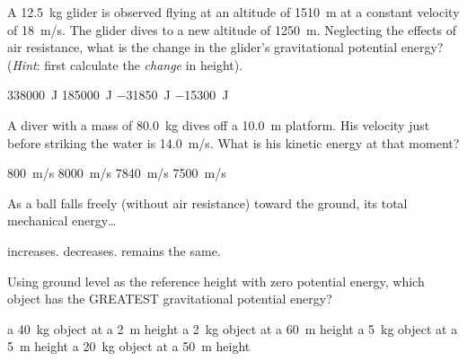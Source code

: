 \documentclass{exam}
\begin{document}
\begin{questions}
\begin{center}
\begin{minipage}{0.4\textwidth}
\begin{center}
\end{center}
\end{minipage}
\end{center}

\question
A \SI{12.5}{kg} glider is observed flying at an altitude of \SI{1510}{m} at a constant velocity of \SI{18}{m/s}. The glider dives to a new altitude of \SI{1250}{m}. Neglecting the effects of air resistance, what is the change in the glider's gravitational potential energy? (\textit{Hint}: first calculate the \textit{change} in height).

\begin{randomizeoneparchoices}
\choice \SI{338000}{J}
\choice \SI{185000}{J}
\correctchoice \SI{-31850}{J}
\choice \SI{-15300}{J}
\end{randomizeoneparchoices}

\question
A diver with a mass of \SI{80.0}{kg} dives off a \SI{10.0}{m} platform. His velocity just before striking the water is \SI{14.0}{m/s}. What is his kinetic energy at that moment?

\begin{randomizeoneparchoices}
\choice \SI{800}{m/s}
\choice \SI{8000}{m/s}
\correctchoice \SI{7840}{m/s}
\choice \SI{7500}{m/s}
\end{randomizeoneparchoices}

\question
As a ball falls freely (without air resistance) toward the ground, its total mechanical energy\ldots 

\begin{randomizeoneparchoices}
\choice increases.
\choice decreases.
\correctchoice remains the same.
\end{randomizeoneparchoices}

\question
Using ground level as the reference height with zero potential energy, which object has the GREATEST gravitational potential energy?

\begin{randomizechoices}
\choice a \SI{40}{kg} object at a \SI{2}{m} height
\choice a \SI{2}{kg} object at a \SI{60}{m} height
\choice a \SI{5}{kg} object at a \SI{5}{m} height
\correctchoice a \SI{20}{kg} object at a \SI{50}{m} height
\end{randomizechoices}


\end{questions}
\end{document}
